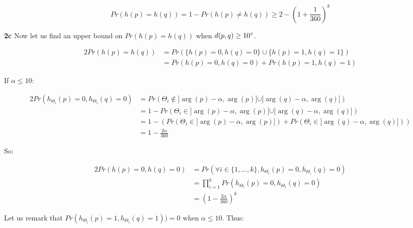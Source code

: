 \documentclass[10pt,a4paper]{article}
\theoremstyle{plain}
\begin{document}
$$
Pr(h(p) = h(q)) = 1 - Pr(h(p) \neq h(q)) \geq 2 - \left(1 + \frac{1}{360}\right)^k
$$

\textbf{2c} Now let us find an upper bound on $Pr(h(p) = h(q))$ when $d(p, q) \geq 10\degree$.

\begin{alignat*}{2}
Pr(h(p) = h(q)) & = Pr(\{h(p) = 0, h(q) = 0\} \cup \{h(p) = 1, h(q) = 1\}) \\
& = Pr(h(p) = 0, h(q) = 0) + Pr(h(p) = 1, h(q) = 1)
\end{alignat*}

If $\alpha \leq 10$:

\begin{alignat*}{2}
Pr(h_{\Theta_i}(p) = 0, h_{\Theta_i}(q) = 0) & = Pr(\Theta_i \not \in ]\arg(p)-\alpha, \arg(p)] \cup ]\arg(q)-\alpha, \arg(q)]) \\
& = 1 - Pr(\Theta_i \in ]\arg(p)-\alpha, \arg(p)] \cup ]\arg(q)-\alpha, \arg(q)]) \\
& = 1 - (Pr(\Theta_i \in ]\arg(p)-\alpha, \arg(p)]) + Pr(\Theta_i \in ]\arg(q)-\alpha, \arg(q)])) \\
& = 1 - \frac{2\alpha}{360}
\end{alignat*}

So:

\begin{alignat*}{2}
Pr(h(p) = 0, h(q) = 0) & = Pr(\forall i \in \{1, ..., k\}, h_{\Theta_i}(p) = 0, h_{\Theta_i}(q) = 0) \\
& = \prod_{i=1}^k{Pr(h_{\Theta_i}(p) = 0, h_{\Theta_i}(q) = 0)} \\
& = \left(1 - \frac{2\alpha}{360}\right)^k
\end{alignat*}

Let us remark that $Pr(h_{\Theta_i}(p) = 1, h_{\Theta_i}(q) = 1)) = 0$ when $\alpha \leq 10$. Thus:
\end{document}
